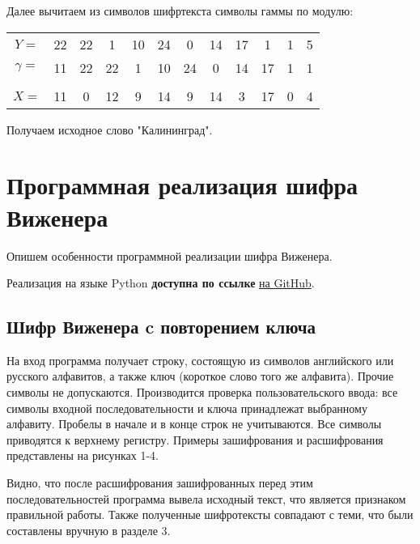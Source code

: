 Далее вычитаем из символов шифртекста символы гаммы по модулю:
\begin{table*}[h!]
    \centering
    \begin{tabular}{c*{11}{@{\;}c}}
        $Y =$ & 22 & 22 & 1 & 10 & 24 & 0 & 14 & 17 & 1 & 1 & 5 \\[4pt]
        $\gamma =$ & 11 & 22 & 22 & 1 & 10 & 24 & 0 & 14 & 17 & 1 & 1 \\[4pt]
      \hline \\ [-1.5ex]
        $X =$ & 11 & 0 & 12 & 9 & 14 & 9 & 14 & 3 & 17 & 0 & 4
    \end{tabular}
\end{table*}

Получаем исходное слово "Калининград".
\newpage



\section{Программная реализация шифра Виженера}
Опишем особенности программной реализации шифра Виженера.

Реализация на языке Python {\bf доступна по ссылке} \href{https://github.com/shadrunov/mathmethods-labs/tree/lab3-vigenere}{на GitHub}.

\subsection{Шифр Виженера c повторением ключа}
На вход программа получает строку, состоящую из символов английского или русского алфавитов, а также ключ (короткое слово того же алфавита). Прочие символы не допускаются. Производится проверка пользовательского ввода: все символы входной последовательности и ключа принадлежат выбранному алфавиту. Пробелы в начале и в конце строк не учитываются. Все символы приводятся к верхнему регистру.
Примеры зашифрования и расшифрования представлены на рисунках 1-4.

Видно, что после расшифрования зашифрованных перед этим последовательностей программа вывела исходный текст, что является признаком правильной работы. Также полученные шифротексты совпадают с теми, что были составлены вручную в разделе 3.

\FloatBarrier


